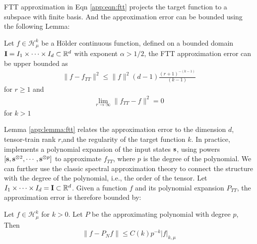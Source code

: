 FTT approximation in Eqn \ref{app:eqn:ftt} projects the target function to a subspace with finite basis. And the approximation error can be bounded using the following Lemma:
\begin{lemma}
	Let $f\in \mathcal{H}^k_\mu$ be a H\"older continuous function, defined on a bounded domain $\mathbf{I} = I_1 \times \cdots \times I_d \subset {\mathbb R}^d$ with exponent $\alpha > 1/2$, the FTT approximation error can be upper bounded as
	\begin{eqnarray}
	\|f- f_{TT} \|^2 \leq \|f \|^2 (d-1)\frac{(r+1)^{-(k-1)}}{(k-1)}
	\end{eqnarray}
	for $r\geq 1$ and
	\begin{eqnarray}
	\lim_{r\rightarrow \infty}\|f_{TT}-f\| ^2 =0
	\end{eqnarray}
	for $k>1$
	\label{app:lemma:ftt}
\end{lemma}
%
Lemma \ref{app:lemma:ftt} relates  the approximation error to the  dimension  $d$,  tensor-train rank $r$,and  the regularity of the target function $k$. In practice, \trnn{} implements a polynomial expansion of the input states ${\mathbf{s}}$, using powers $[{\mathbf{s}}, {\mathbf{s}}^{\otimes 2}, \cdots, {\mathbf{s}}^{\otimes p}]$ to approximate $f_{TT}$, where $p$ is the degree of the polynomial.  We can further use the classic spectral  approximation  theory to connect the \trnn{} structure  with the degree of the polynomial, i.e., the order of the tensor. Let $I_1 \times \cdots \times I_d = {\mathbf{I}} \subset {\mathbb R}^d $. Given a  function $f$  and its polynomial  expansion  $P_{TT}$, the approximation error  is therefore bounded by:
%
\begin{lemma}
	Let $f\in  \mathcal{H}^k_\mu$ for $k>0$. Let $P$ be  the approximating polynomial with degree $p$, Then
	\[ \|f - P_N f\| \leq C(k)p^{-k}|f|_{k,\mu}  \]
\end{lemma}

